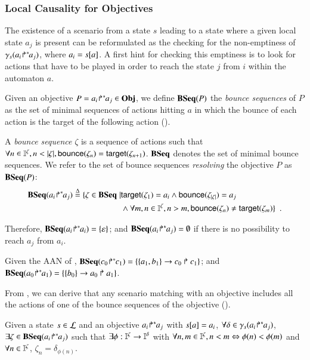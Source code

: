 \subsubsection{Local Causality for Objectives}

The existence of a scenario from a state $s$ leading to a state
where a given local state $a_j$ is present
can be reformulated as the checking for the non-emptiness of $\gamma_s({a_i\!\Rsh^*\!\!a_j})$, where
$a_i=s[{a}]$.
A first hint for checking this emptiness is to look for actions that have to be played in order to
reach the state $j$ from $i$ within the automaton $a$.

Given an objective $P = {a_i\!\Rsh^*\!\!a_j} \in\mathbf{Obj}$, we define $\mathbf{BSeq}(P)$ the \emph{bounce sequences} of
$P$ as the set of minimal sequences of actions hitting $a$ in which the bounce of each action is
the target of the following action ().

\begin{definition}\label{def:bs}
A \emph{bounce sequence} $\zeta$  is a sequence of actions such that
$\forall n\in\indexes{\zeta}, n<|\zeta|,
\bounce{\zeta_{n}} = \target{\zeta_{n+1}}$.
$\mathbf{BSeq}$ denotes the set of minimal bounce sequences.
We refer to the set of bounce sequences \emph{resolving} the objective $P$ as
$\mathbf{BSeq}(P)$:
\begin{align*}
\mathbf{BSeq}({a_i\!\Rsh^*\!\!a_j}) \stackrel{\Delta}= \{ \zeta\in\mathbf{BSeq}\mid & \mathsf{target}(\zeta_1)=a_i\wedge
			    \mathsf{bounce}(\zeta_{|\zeta|})=a_j \\
& \wedge \forall m,n\in\mathbb{I}^{\zeta}, n>m, \mathsf{bounce}(\zeta_n)\neq\mathsf{target}(\zeta_m)
				\}\enspace.
\end{align*}
\end{definition}

Therefore,
$\mathbf{BSeq}({a_i\!\Rsh^*\!\!a_i}) = \{\varepsilon\}$; and
$\mathbf{BSeq}({a_i\!\Rsh^*\!\!a_j}) = \emptyset$ if there is no possibility to reach $a_j$ from
$a_i$.

\begin{example}
Given the AAN of ,
$\mathbf{BSeq}({c_0\!\Rsh^*\!\!c_1}) = \{\{a_1,b_1\}\rightarrow c_0\Rsh c_1\}$;
and 
$\mathbf{BSeq}({a_0\!\Rsh^*\!\!a_1}) = \{\{b_0\}\rightarrow a_0\Rsh a_1\}$.
\end{example}

From , we can derive that any scenario matching with an objective includes all the
actions of one of the bounce sequences of the objective ().
\begin{lemma}
Given a state $s\in \mathcal{L}$ and an objective ${a_i\!\Rsh^*\!\!a_j}$ with $s[{a}]=a_i$,
$\forall\delta\in\gamma_s({a_i\!\Rsh^*\!\!a_j})$,
$\exists\zeta\in\mathbf{BSeq}({a_i\!\Rsh^*\!\!a_j})$ such that
$\exists \phi: \mathbb{I}^{\zeta}\to\mathbb{I}^{\delta}$
with
$\forall n,m\in\mathbb{I}^{\zeta}, n<m \Leftrightarrow \phi(n)<\phi(m)$
and
$\forall n\in\mathbb{I}^{\zeta}$, $\zeta_n = \delta_{\phi(n)}$.
\label{lem:bs-concr}
\end{lemma}



